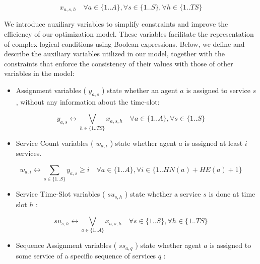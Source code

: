 \documentclass[10pt]{article}
\begin{document}
\begin{equation*}
x_{a, s, h} \quad \forall a \in\{1 . . A\}, \forall s \in\{1 . . S\}, \forall h \in\{1 . . T S\} \tag{1}
\end{equation*}


We introduce auxiliary variables to simplify constraints and improve the efficiency of our optimization model. These variables facilitate the representation of complex logical conditions using Boolean expressions. Below, we define and describe the auxiliary variables utilized in our model, together with the constraints that enforce the consistency of their values with those of other variables in the model:

\begin{itemize}
  \item Assignment variables ( $y_{a, s}$ ) state whether an agent $a$ is assigned to service $s$, without any information about the time-slot:
\end{itemize}


\begin{equation*}
y_{a, s} \leftrightarrow \bigvee_{h \in\{1 . . T S\}} x_{a, s, h} \quad \forall a \in\{1 . . A\}, \forall s \in\{1 . . S\} \tag{2}
\end{equation*}


\begin{itemize}
  \item Service Count variables ( $w_{a, i}$ ) state whether agent $a$ is assigned at least $i$ services.
\end{itemize}


\begin{equation*}
w_{a, i} \leftrightarrow \sum_{s \in\{1 . . S\}} y_{a, s} \geq i \quad \forall a \in\{1 . . A\}, \forall i \in\{1 . . H N(a)+H E(a)+1\} \tag{3}
\end{equation*}


\begin{itemize}
  \item Service Time-Slot variables ( $s u_{s, h}$ ) state whether a service $s$ is done at time slot $h$ :
\end{itemize}


\begin{equation*}
s u_{s, h} \leftrightarrow \bigvee_{a \in\{1 . . A\}} x_{a, s, h} \quad \forall s \in\{1 . . S\}, \forall h \in\{1 . . T S\} \tag{4}
\end{equation*}


\begin{itemize}
  \item Sequence Assignment variables ( $s s_{a, q}$ ) state whether agent $a$ is assigned to some service of a specific sequence of services $q$ :
\end{itemize}
\end{document}
